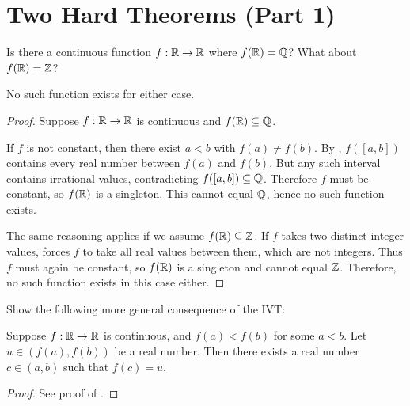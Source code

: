 \section{Two Hard Theorems (Part 1)}

\begin{problem}
  Is there a continuous function $f : \mathbb{R} \to \mathbb{R}$ where $f(\mathbb{R}) = \mathbb{Q}$? What about $f(\mathbb{R}) = \mathbb{Z}$?

  \vspace{\baselineskip}

  No such function exists for either case.

  \begin{proof}
    Suppose $f : \mathbb{R} \to \mathbb{R}$ is continuous and $f(\mathbb{R}) \subseteq \mathbb{Q}$. 

    If $f$ is not constant, then there exist $a<b$ with $f(a) \neq f(b)$. By
    , $f([a,b])$ contains every real
    number between $f(a)$ and $f(b)$. But any such interval contains irrational
    values, contradicting $f([a,b]) \subseteq \mathbb{Q}$. Therefore $f$ must be
    constant, so $f(\mathbb{R})$ is a singleton. This cannot equal $\mathbb{Q}$, hence no such
    function exists.

    The same reasoning applies if we assume $f(\mathbb{R}) \subseteq \mathbb{Z}$. If $f$ takes
    two distinct integer values,  forces
    $f$ to take all real values between them, which are not integers. Thus $f$
    must again be constant, so $f(\mathbb{R})$ is a singleton and cannot equal $\mathbb{Z}$.
    Therefore, no such function exists in this case either.
  \end{proof}

\end{problem}

\begin{problem}
  Show the following more general consequence of the IVT:

  Suppose $f: \mathbb{R} \to \mathbb{R}$ is continuous, and $f(a) < f(b)$ for some $a < b$. Let
  $u \in (f(a), f(b))$ be a real number. Then there exists a real number $c \in
  (a, b)$ such that $f(c) = u$.

  \begin{proof} 
    See proof of .
  \end{proof} 
\end{problem}

